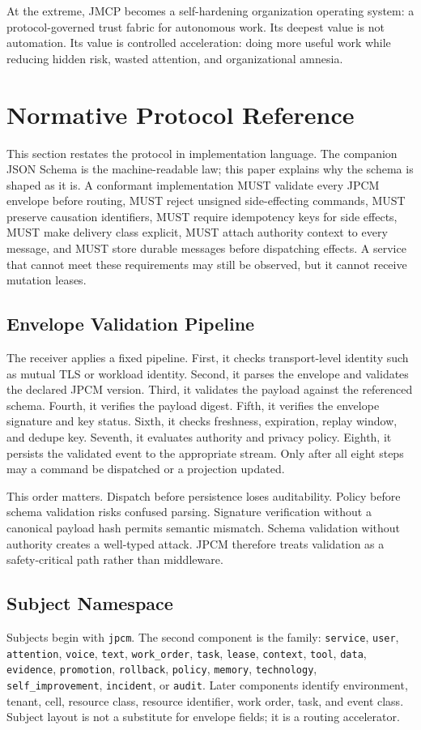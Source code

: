 \documentclass[10pt,journal,onecolumn]{IEEEtran}
\begin{document}
At the extreme, JMCP becomes a self-hardening organization operating system: a protocol-governed trust fabric for autonomous work. Its deepest value is not automation. Its value is controlled acceleration: doing more useful work while reducing hidden risk, wasted attention, and organizational amnesia.


\section{Normative Protocol Reference}
This section restates the protocol in implementation language. The companion JSON Schema is the machine-readable law; this paper explains why the schema is shaped as it is. A conformant implementation MUST validate every JPCM envelope before routing, MUST reject unsigned side-effecting commands, MUST preserve causation identifiers, MUST require idempotency keys for side effects, MUST make delivery class explicit, MUST attach authority context to every message, and MUST store durable messages before dispatching effects. A service that cannot meet these requirements may still be observed, but it cannot receive mutation leases.

\subsection{Envelope Validation Pipeline}
The receiver applies a fixed pipeline. First, it checks transport-level identity such as mutual TLS or workload identity. Second, it parses the envelope and validates the declared JPCM version. Third, it validates the payload against the referenced schema. Fourth, it verifies the payload digest. Fifth, it verifies the envelope signature and key status. Sixth, it checks freshness, expiration, replay window, and dedupe key. Seventh, it evaluates authority and privacy policy. Eighth, it persists the validated event to the appropriate stream. Only after all eight steps may a command be dispatched or a projection updated.

This order matters. Dispatch before persistence loses auditability. Policy before schema validation risks confused parsing. Signature verification without a canonical payload hash permits semantic mismatch. Schema validation without authority creates a well-typed attack. JPCM therefore treats validation as a safety-critical path rather than middleware.

\subsection{Subject Namespace}
Subjects begin with \texttt{jpcm}. The second component is the family: \texttt{service}, \texttt{user}, \texttt{attention}, \texttt{voice}, \texttt{text}, \texttt{work\_order}, \texttt{task}, \texttt{lease}, \texttt{context}, \texttt{tool}, \texttt{data}, \texttt{evidence}, \texttt{promotion}, \texttt{rollback}, \texttt{policy}, \texttt{memory}, \texttt{technology}, \texttt{self\_improvement}, \texttt{incident}, or \texttt{audit}. Later components identify environment, tenant, cell, resource class, resource identifier, work order, task, and event class. Subject layout is not a substitute for envelope fields; it is a routing accelerator.
\end{document}
